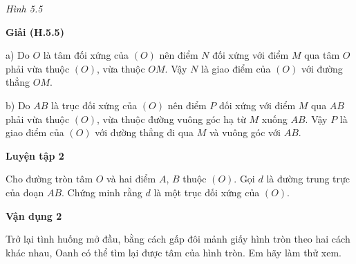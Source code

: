 \begin{lesson}
\begin{center}
        \textit{Hình 5.5}
    \end{center}

    \textbf{Giải (H.5.5)}

    a) Do $O$ là tâm đối xứng của $(O)$ nên điểm $N$ đối xứng với điểm $M$ qua tâm $O$ phải vừa thuộc $(O)$, vừa thuộc $OM$. Vậy $N$ là giao điểm của $(O)$ với đường thẳng $OM$.

    b) Do $AB$ là trục đối xứng của $(O)$ nên điểm $P$ đối xứng với điểm $M$ qua $AB$ phải vừa thuộc $(O)$, vừa thuộc đường vuông góc hạ từ $M$ xuống $AB$. Vậy $P$ là giao điểm của $(O)$ với đường thẳng đi qua $M$ và vuông góc với $AB$.

    \textbf{Luyện tập 2}

    Cho đường tròn tâm $O$ và hai điểm $A$, $B$ thuộc $(O)$. Gọi $d$ là đường trung trực của đoạn $AB$. Chứng minh rằng $d$ là một trục đối xứng của $(O)$.

    \answerline
    \answerline
    \answerline

    \textbf{Vận dụng 2}

    Trở lại tình huống mở đầu, bằng cách gấp đôi mảnh giấy hình tròn theo hai cách khác nhau, Oanh có thể tìm lại được tâm của hình tròn. Em hãy làm thử xem.

    \answerline
\end{lesson}

